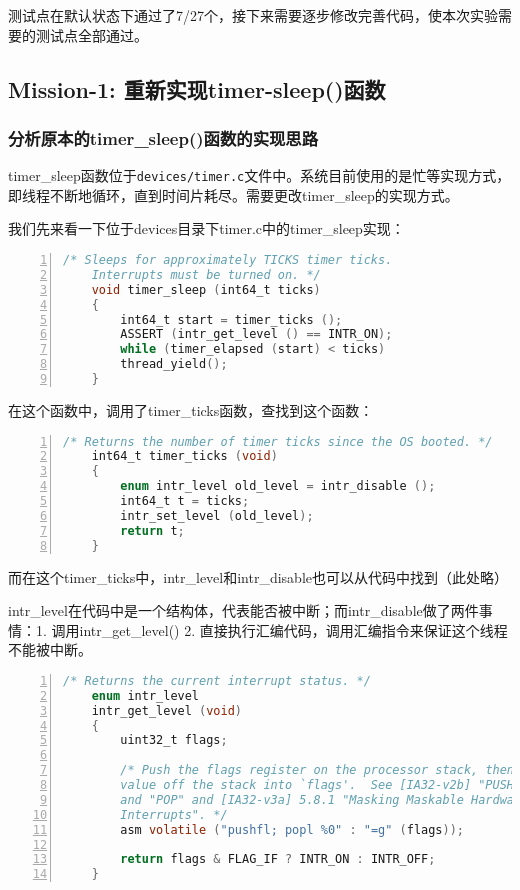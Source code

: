 \documentclass{article}
\begin{document}
    测试点在默认状态下通过了7/27个，接下来需要逐步修改完善代码，使本次实验需要的测试点全部通过。
	
	\subsection{Mission-1: 重新实现timer-sleep()函数}
	\subsubsection{分析原本的timer\_sleep()函数的实现思路}
	
	timer\_sleep函数位于\texttt{devices/timer.c}文件中。系统目前使用的是忙等实现方式，即线程不断地循环，直到时间片耗尽。需要更改timer\_sleep的实现方式。
	
	我们先来看一下位于devices目录下timer.c中的timer\_sleep实现：
	
	\begin{lstlisting}[xleftmargin = 4em,xrightmargin = 4em, aboveskip = 1em, numbers = left, language = C,title=原本的\texttt{timer\_sleep()}函数]
    /* Sleeps for approximately TICKS timer ticks.  
    Interrupts must be turned on. */
    void timer_sleep (int64_t ticks)
    {
    	int64_t start = timer_ticks ();
    	ASSERT (intr_get_level () == INTR_ON);
    	while (timer_elapsed (start) < ticks)
    	thread_yield();
    }
	\end{lstlisting}
	
	在这个函数中，调用了timer\_ticks函数，查找到这个函数：
	
	\begin{lstlisting}[xleftmargin = 4em,xrightmargin = 4em, aboveskip = 1em, numbers = left, language = C,title=\texttt{timer\_ticks()}函数]
    /* Returns the number of timer ticks since the OS booted. */
    int64_t timer_ticks (void)
    {
    	enum intr_level old_level = intr_disable ();
    	int64_t t = ticks;
    	intr_set_level (old_level);
    	return t;
    }
	\end{lstlisting}
	
	而在这个timer\_ticks中，intr\_level和intr\_disable也可以从代码中找到（此处略）
	
	intr\_level在代码中是一个结构体，代表能否被中断；而intr\_disable做了两件事情：1. 调用intr\_get\_level() 2. 直接执行汇编代码，调用汇编指令来保证这个线程不能被中断。
	
	\begin{lstlisting}[xleftmargin = 4em,xrightmargin = 4em, aboveskip = 1em, numbers = left, language = C,title=\texttt{get\_level()}函数]
    /* Returns the current interrupt status. */
    enum intr_level
    intr_get_level (void)
    {
    	uint32_t flags;
    	
    	/* Push the flags register on the processor stack, then pop the
    	value off the stack into `flags'.  See [IA32-v2b] "PUSHF"
    	and "POP" and [IA32-v3a] 5.8.1 "Masking Maskable Hardware
    	Interrupts". */
    	asm volatile ("pushfl; popl %0" : "=g" (flags));
    	
    	return flags & FLAG_IF ? INTR_ON : INTR_OFF;
    }
	\end{lstlisting}
	
\end{document}
